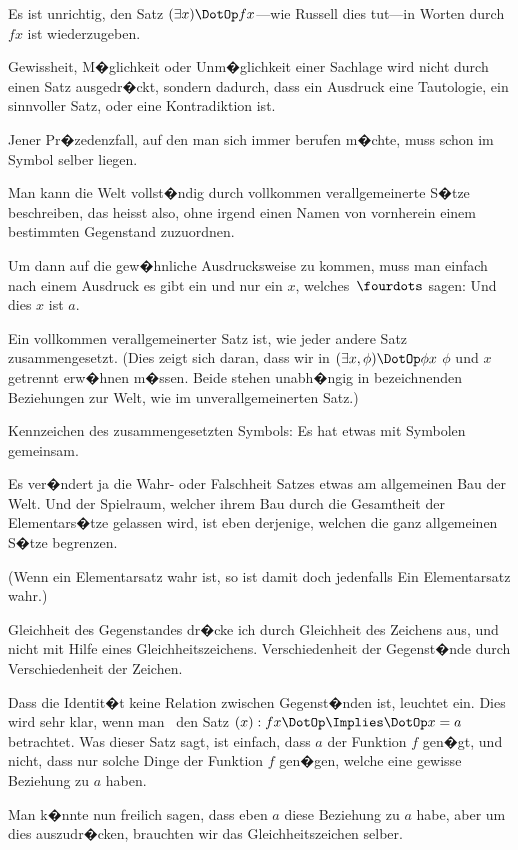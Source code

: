 {Es ist unrichtig, den Satz \glqq{}$(\exists x) \DotOp fx$\grqq{}---wie
Russell dies tut---in Worten durch \glqq{}$fx$ ist \grqq{}
wiederzugeben.

Gewissheit, M�glichkeit oder Unm�glichkeit
einer Sachlage wird nicht durch einen Satz ausgedr�ckt,
sondern dadurch, dass ein Ausdruck eine
Tautologie, ein sinnvoller Satz, oder eine Kontradiktion
ist.

Jener Pr�zedenzfall, auf den man sich immer
berufen m�chte, muss schon im Symbol selber
liegen.}


{Man kann die Welt vollst�ndig durch vollkommen
verallgemeinerte S�tze beschreiben, das
heisst also, ohne irgend einen Namen von vornherein
einem bestimmten Gegenstand zuzuordnen.

Um dann auf die gew�hnliche Ausdrucksweise
zu kommen, muss man einfach nach einem Ausdruck
\glqq{}es gibt ein und nur ein $x$, welches~$\fourdots$\grqq{} sagen:
Und dies $x$ ist $a$.}


{Ein vollkommen verallgemeinerter Satz ist, wie
jeder andere Satz zusammengesetzt. (Dies zeigt
sich daran, dass wir in \glqq{}$(\exists x, \phi) \DotOp \phi x$\grqq{} \glqq{}$\phi$\grqq{} und \glqq{}$x$\grqq{}
getrennt erw�hnen m�ssen. Beide stehen unabh�ngig
in bezeichnenden Beziehungen zur Welt,
wie im unverallgemeinerten Satz.)

Kennzeichen des zusammengesetzten Symbols:
Es hat etwas mit  Symbolen gemeinsam.}


{Es ver�ndert ja die Wahr- oder Falschheit 
Satzes etwas am allgemeinen Bau der Welt. Und
der Spielraum, welcher ihrem Bau durch die
Gesamtheit der Elementars�tze gelassen wird, ist
eben derjenige, welchen die ganz allgemeinen
S�tze begrenzen.

(Wenn ein Elementarsatz wahr ist, so ist damit
doch jedenfalls Ein Elementarsatz  wahr.)}


{{\verystretchyspace
Gleichheit des Gegenstandes dr�cke ich durch
Gleichheit des Zeichens aus, und nicht mit Hilfe
eines Gleichheitszeichens. Verschiedenheit der
\enlargethispage{7pt} %
Gegenst�nde durch Verschiedenheit der Zeichen.}}


{Dass die Identit�t keine Relation zwischen Gegenst�nden
ist, leuchtet ein. Dies wird sehr klar,
wenn man \zumBeispiel\ den Satz \glqq{}$(x) : fx \DotOp \Implies \DotOp x = a$\grqq{}
betrachtet. Was dieser Satz sagt, ist einfach,
dass  $a$ der Funktion $f$ gen�gt, und nicht,
dass nur solche Dinge der Funktion $f$ gen�gen,
welche eine gewisse Beziehung zu $a$ haben.

Man k�nnte nun freilich sagen, dass eben 
$a$ diese Beziehung zu $a$ habe, aber um dies auszudr�cken,
brauchten wir das Gleichheitszeichen
selber.}


